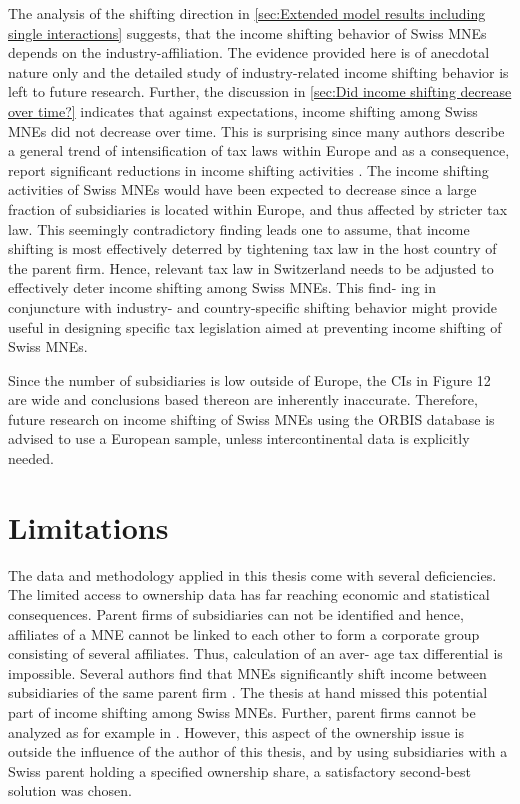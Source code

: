 \documentclass[10pt,twocolumn,oneside,cmyk]{article}
\begin{document}
The analysis of the shifting direction in \cref{sec:Extended model results including single interactions} suggests, that the income shifting behavior of Swiss MNEs depends on the industry-affiliation. The evidence provided here is of anecdotal nature only and the detailed study of industry-related income shifting behavior is left to future research. Further, the discussion in \cref{sec:Did income shifting decrease over time?} indicates that against expectations, income shifting among Swiss MNEs did not decrease over time. This is surprising since many authors describe a general trend of intensification of tax laws within Europe and as a consequence, report significant reductions in income shifting activities \parencites[for example][23-24]{lohse_increasing_2012}[729]{marques_is_2016}. The income shifting activities of Swiss MNEs would have been expected to decrease since a large fraction of subsidiaries is located within Europe, and thus affected by stricter tax law. This seemingly contradictory finding leads one to assume, that income shifting is most effectively deterred by tightening tax law in the host country of the parent firm. Hence, relevant tax law in Switzerland needs to be adjusted to effectively deter income shifting among Swiss MNEs. This find- ing in conjuncture with industry- and country-specific shifting behavior might provide useful in designing specific tax legislation aimed at preventing income shifting of Swiss MNEs.

Since the number of subsidiaries is low outside of Europe, the CIs in Figure 12 are wide and conclusions based thereon are inherently inaccurate. Therefore, future research on income shifting of Swiss MNEs using the ORBIS database is advised to use a European sample, unless intercontinental data is explicitly needed.

\section{Limitations} \label{sec:Limitations}
The data and methodology applied in this thesis come with several deficiencies. The limited access to ownership data has far reaching economic and statistical consequences. Parent firms of subsidiaries can not be identified and hence, affiliates of a MNE cannot be linked to each other to form a corporate group consisting of several affiliates. Thus, calculation of an aver- age tax differential is impossible. Several authors find that MNEs significantly shift income between subsidiaries of the same parent firm \parencites[for example][1174]{huizinga_international_2008}[18-19]{dischinger_corporate_2008}. The thesis at hand missed this potential part of income shifting among Swiss MNEs. Further, parent firms cannot be analyzed as for example in \textcite[260-261]{dischinger_role_2014}. However, this aspect of the ownership issue is outside the influence of the author of this thesis, and by using subsidiaries with a Swiss parent holding a specified ownership share, a satisfactory second-best solution was chosen.
\end{document}

